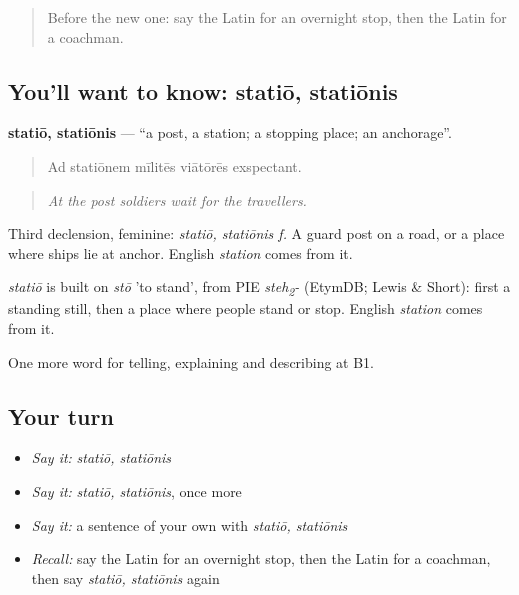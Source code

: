 \begin{quote}
Before the new one: say the Latin for an overnight stop, then the Latin for a coachman.
\end{quote}

\subsection*{You'll want to know: statiō, statiōnis}
\textbf{statiō, statiōnis} — \textquotedblleft{}a post, a station; a stopping place; an anchorage\textquotedblright{}.

\begin{quote}
Ad statiōnem mīlitēs viātōrēs exspectant.
\end{quote}

\begin{quote}
\emph{At the post soldiers wait for the travellers.}
\end{quote}

Third declension, feminine: \emph{statiō, statiōnis f.} A guard post on a road, or a place where ships lie at anchor. English \emph{station} comes from it.

\begin{cousinweb}
\emph{statiō} is built on \emph{stō} 'to stand', from PIE \emph{steh\textsubscript{2}-} (EtymDB; Lewis \& Short): first a standing still, then a place where people stand or stop. English \emph{station} comes from it.
\end{cousinweb}

\begin{grammarlens}[title={What you've built}]
One more word for telling, explaining and describing at B1.
\end{grammarlens}

\subsection*{Your turn}
\begin{itemize}
\raggedright
  \item \emph{Say it:} \emph{statiō, statiōnis}
  \item \emph{Say it:} \emph{statiō, statiōnis}, once more
  \item \emph{Say it:} a sentence of your own with \emph{statiō, statiōnis}
  \item \emph{Recall:} say the Latin for an overnight stop, then the Latin for a coachman, then say \emph{statiō, statiōnis} again
\end{itemize}

